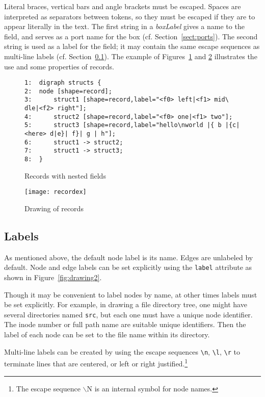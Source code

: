 \documentclass[11pt]{article}
\begin{document}
{Literal braces, vertical bars and angle brackets must be escaped. 
Spaces are interpreted as separators between tokens, so they
must be escaped if they are to appear literally in the text.
The first string in a {\it boxLabel} gives a name to the field,
and serves as a port name for the box (cf. Section~\ref{sect:ports}).
The second string is used as a label for the field; 
it may contain the same escape sequences as multi-line 
labels (cf. Section~\ref{sect:labels}).
The example of Figures~\ref{fig:record} and \ref{fig:recorddrawing}
illustrates the use and some properties of records.

\begin{figure}[p]\footnotesize
\begin{verbatim}
1:  digraph structs {
2:  node [shape=record];
3:      struct1 [shape=record,label="<f0> left|<f1> mid\ dle|<f2> right"];
4:      struct2 [shape=record,label="<f0> one|<f1> two"];
5:      struct3 [shape=record,label="hello\nworld |{ b |{c|<here> d|e}| f}| g | h"];
6:      struct1 -> struct2;
7:      struct1 -> struct3;
8:  }
\end{verbatim}
\caption{Records with nested fields}
\label{fig:record}
\end{figure}
\begin{figure}[p]
	\centerline {
		\texttt{[image: recordex]}
	}
    \caption{Drawing of records}
    \label{fig:recorddrawing}
\end{figure}

\subsection{Labels}
\label{sect:labels}

As mentioned above, the default node label is its name.
Edges are unlabeled by default.
Node and edge labels can be set explicitly using the {\tt label}
attribute as shown in 
Figure~\ref{fig:drawing2}.

Though it may be convenient to label nodes by name, at other times
labels must be set explicitly.  For example, in drawing a file
directory tree, one might have several directories named {\tt src},
but each one must have a unique node identifier.
The inode number or full path name are suitable unique identifiers.
Then the label of each node can be set to the file name within
its directory. 

Multi-line labels can be created by using the escape 
sequences \verb"\n", \verb"\l", \verb"\r" to terminate
lines that are centered, or left or right justified.\footnote{The escape
sequence $\backslash$N is an internal symbol for node names.}

}
\end{document}
